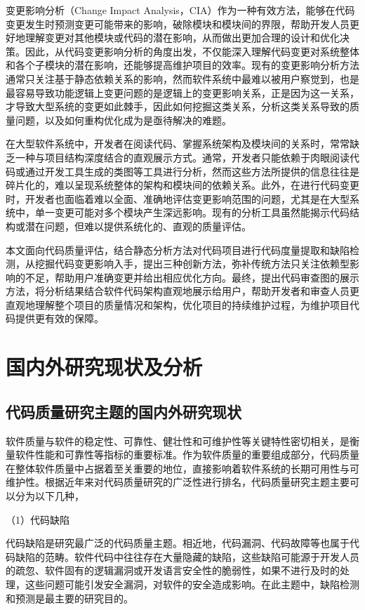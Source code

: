 变更影响分析（Change Impact Analysis，CIA）作为一种有效方法，能够在代码变更发生时预测变更可能带来的影响，破除模块和模块间的界限，帮助开发人员更好地理解变更对其他模块或代码的潜在影响，从而做出更加合理的设计和优化决策。因此，从代码变更影响分析的角度出发，不仅能深入理解代码变更对系统整体和各个子模块的潜在影响，还能够提高维护项目的效率\cite{2022An}。现有的变更影响分析方法通常只关注基于静态依赖关系的影响，然而软件系统中最难以被用户察觉到，也是最容易导致功能逻辑上变更问题的是逻辑上的变更影响关系，正是因为这一关系，才导致大型系统的变更如此棘手，因此如何挖掘这类关系，分析这类关系导致的质量问题，以及如何重构优化成为是亟待解决的难题。

在大型软件系统中，开发者在阅读代码、掌握系统架构及模块间的关系时，常常缺乏一种与项目结构深度结合的直观展示方式。通常，开发者只能依赖于肉眼阅读代码或通过开发工具生成的类图等工具进行分析，然而这些方法所提供的信息往往是碎片化的，难以呈现系统整体的架构和模块间的依赖关系。此外，在进行代码变更时，开发者也面临着难以全面、准确地评估变更影响范围的问题，尤其是在大型系统中，单一变更可能对多个模块产生深远影响。现有的分析工具虽然能揭示代码结构或潜在问题，但难以提供系统化的、直观的质量评估。

本文面向代码质量评估，结合静态分析方法对代码项目进行代码度量提取和缺陷检测，从挖掘代码变更影响入手，提出三种创新方法，弥补传统方法只关注依赖型影响的不足，帮助用户准确变更并给出相应优化方向。最终，提出代码审查图的展示方法，将分析结果结合软件代码架构直观地展示给用户，帮助开发者和审查人员更直观地理解整个项目的质量情况和架构，优化项目的持续维护过程，为维护项目代码提供更有效的保障。

\section{国内外研究现状及分析}


\subsection{代码质量研究主题的国内外研究现状}

软件质量与软件的稳定性、可靠性、健壮性和可维护性等关键特性密切相关，是衡量软件性能和可靠性等指标的重要标准。作为软件质量的重要组成部分，代码质量在整体软件质量中占据着至关重要的地位，直接影响着软件系统的长期可用性与可维护性。根据近年来对代码质量研究的广泛性进行排名\cite{NUNEZVARELA2017164}，代码质量研究主题主要可以分为以下几种，

（1）代码缺陷

代码缺陷是研究最广泛的代码质量主题。相近地，代码漏洞、代码故障等也属于代码缺陷的范畴。软件代码中往往存在大量隐藏的缺陷，这些缺陷可能源于开发人员的疏忽、软件固有的逻辑漏洞或开发语言安全性的脆弱性，如果不进行及时的处理，这些问题可能引发安全漏洞，对软件的安全造成影响。在此主题中，缺陷检测和预测是最主要的研究目的。

